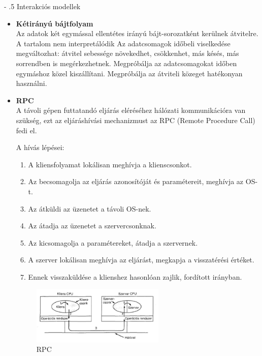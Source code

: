 \documentclass[12pt]{article}
\makeatletter
\renewcommand\paragraph{%
	\@startsection{paragraph}{4}{0mm}%
	{-\baselineskip}%
	{.5\baselineskip}%
	{\normalfont\normalsize\bfseries}}
\makeatother
\begin{document}
    \paragraph{Interakciós modellek}

    \begin{itemize}
        \item \textbf{\small Kétirányú bájtfolyam} \\
        {\small Az adatok két egymással ellentétes irányú bájt-sorozatként kerülnek átvitelre. A tartalom nem interpretálódik Az adatcsomagok időbeli viselkedése megváltozhat: átvitel sebessége növekedhet, csökkenhet, más késés, más sorrendben is megérkezhetnek. Megpróbálja az adatcsomagokat időben egymáshoz közel kiszállítani. Megpróbálja az átviteli közeget hatékonyan használni.}
        	
        \item \textbf{\small RPC} \\
        {\small A távoli gépen futtatandó eljárás eléréséhez hálózati kommunikációra van szükség, ezt az eljáráshívási mechanizmust az RPC (Remote Procedure Call) fedi el.}

        A hívás lépései:
        \begin{enumerate}
            \small
            \item A kliensfolyamat lokálisan meghívja a	klienscsonkot.
            \item Az becsomagolja az eljárás azonosítóját és paramétereit, meghívja az OS-t.
            \item Az átküldi az üzenetet a távoli OS-nek.
            \item Az átadja az üzenetet a szervercsonknak.
            \item Az kicsomagolja a paramétereket, átadja a szervernek.
            \item A szerver lokálisan meghívja az eljárást, megkapja a visszatérési értéket.
            \item Ennek visszaküldése a klienshez hasonlóan zajlik, fordított irányban.
        \end{enumerate}
        \begin{figure}[H]
        	\centering
        	\includegraphics[width=0.6\textwidth]{img/rpc.png}
        	\caption{RPC}
        \end{figure}
    \end{itemize}
\end{document}
